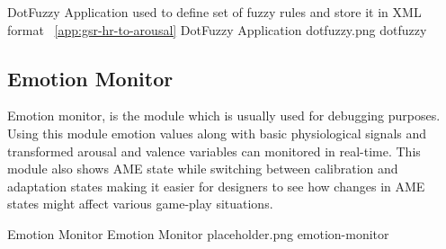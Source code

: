 \largeimg
{DotFuzzy Application used to define set of fuzzy rules and store it in XML format ~\ref{app:gsr-hr-to-arousal}}
{DotFuzzy Application}
{dotfuzzy.png}
{dotfuzzy}

\subsection{Emotion Monitor}
Emotion monitor, is the module which is usually used for debugging purposes. Using this module emotion values along with basic physiological signals and transformed arousal and valence variables can monitored in real-time. This module also shows AME state while switching between calibration and adaptation states making it easier for designers to see how changes in AME states might affect various game-play situations.

\largeimg
{Emotion Monitor}
{Emotion Monitor}
{placeholder.png}
{emotion-monitor}




